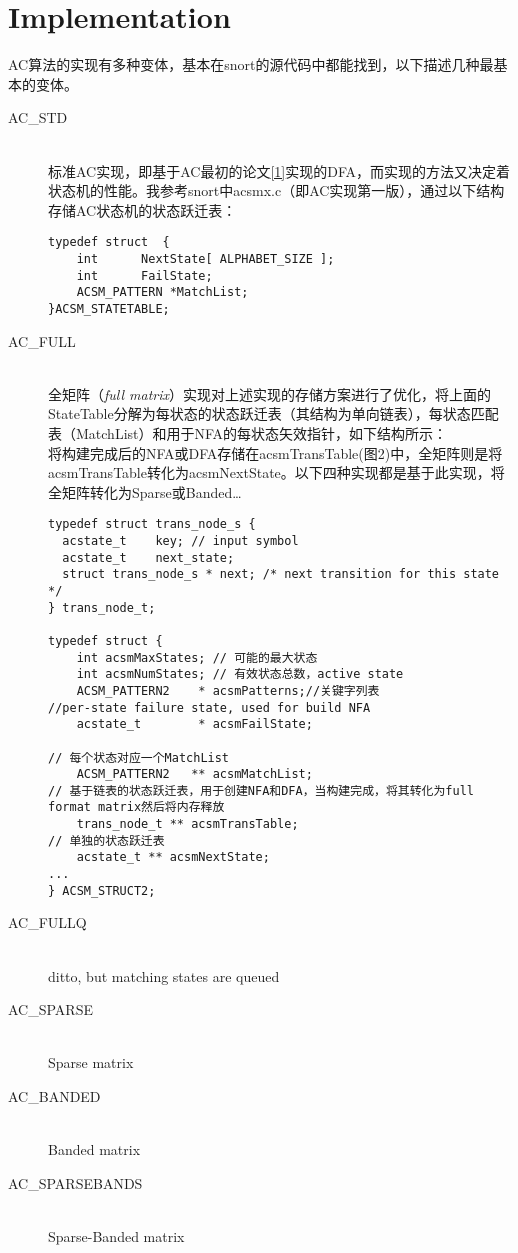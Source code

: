 \documentclass{article}
\begin{document}
\section{Implementation}
AC算法的实现有多种变体，基本在snort的源代码中都能找到，以下描述几种最基本的变体。
\begin{description}
\item[AC\_STD] \hfill \\
标准AC实现，即基于AC最初的论文\ref{1}实现的DFA，而实现的方法又决定着状态机的性能。我参考snort中acsmx.c（即AC实现第一版），通过以下结构存储AC状态机的状态跃迁表：
\begin{lstlisting}
typedef struct  {
    int      NextState[ ALPHABET_SIZE ];
    int      FailState;
    ACSM_PATTERN *MatchList;
}ACSM_STATETABLE;
\end{lstlisting}
\item[AC\_FULL] \hfill \\
全矩阵（\textit{full matrix}）实现对上述实现的存储方案进行了优化，将上面的StateTable分解为每状态的状态跃迁表（其结构为单向链表），每状态匹配表（MatchList）和用于NFA的每状态矢效指针，如下结构所示：\\
将构建完成后的NFA或DFA存储在acsmTransTable(图2)中，全矩阵则是将acsmTransTable转化为acsmNextState。以下四种实现都是基于此实现，将全矩阵转化为Sparse或Banded…
\begin{lstlisting}
typedef struct trans_node_s {
  acstate_t    key; // input symbol
  acstate_t    next_state;
  struct trans_node_s * next; /* next transition for this state */
} trans_node_t;

typedef struct {
    int acsmMaxStates; // 可能的最大状态
    int acsmNumStates; // 有效状态总数，active state
    ACSM_PATTERN2    * acsmPatterns;//关键字列表
//per-state failure state, used for build NFA
    acstate_t        * acsmFailState;

// 每个状态对应一个MatchList
    ACSM_PATTERN2   ** acsmMatchList;
// 基于链表的状态跃迁表，用于创建NFA和DFA，当构建完成，将其转化为full format matrix然后将内存释放
    trans_node_t ** acsmTransTable;
// 单独的状态跃迁表
    acstate_t ** acsmNextState;
...
} ACSM_STRUCT2;
\end{lstlisting}
\item[AC\_FULLQ] \hfill \\
  ditto, but matching states are queued
\item[AC\_SPARSE] \hfill \\
  Sparse matrix
\item[AC\_BANDED] \hfill \\
  Banded matrix
\item[AC\_SPARSEBANDS] \hfill \\
  Sparse-Banded matrix
\end{description}
\end{document}
